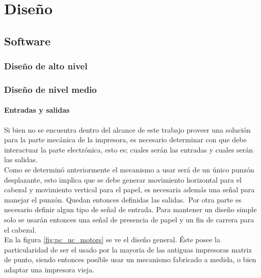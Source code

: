 \chapter{Dise\~no}
%

\section{Software}
\subsection{Dise\~no de alto nivel}
%


\subsection{Dise\~no de nivel medio}
%


\subsubsection{Entradas y salidas}
%
Si bien no se encuentra dentro del alcance de este trabajo proveer una
soluci\'on para la parte mec\'anica de la impresora, es necesario determinar
con que debe interactuar la parte electr\'onica, esto es; cuales ser\'an las
entradas y cuales ser\'an las salidas.\\

Como se determin\'o anteriormente el mecanismo a usar ser\'a de un \'unico
punz\'on desplazante, esto implica que se debe generar movimiento horizontal
para el cabezal y movimiento vertical para el papel, es necesaria adem\'as una
se\~nal para manejar el punz\'on. Quedan entonces definidas las salidas.\
Por otra parte es necesario definir algun tipo de se\~nal de entrada. Para
mantener un dise\~no simple solo se usar\'an entonces una se\~nal de presencia
de papel y un fin de carrera para el cabezal.\\

En la figura \ref{fig:pc_uc_motors} se ve el dise\~no general. \'Este posee la
particularidad de ser el usado por la mayoria de las antiguas impresoras
matriz de punto, siendo entonces posible usar un mecanismo fabricado a medida,
o bien adaptar una impresora vieja.


